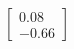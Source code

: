\documentclass[preview]{standalone}
\begin{document}
\begin{align*}
\begin{bmatrix} 0.08 \\ -0.66 \end{bmatrix}
\end{align*}
\end{document}
